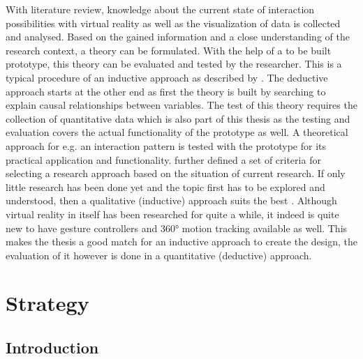 With literature review, knowledge about the current state of interaction possibilities with virtual reality as well as the visualization of data is collected and analysed. Based on the gained information and a close understanding of the research context, a theory can be formulated. With the help of a to be built prototype, this theory can be evaluated and tested by the researcher. This is a typical procedure of an inductive approach as described by \cite{Saunders2009}. \newline
The deductive approach starts at the other end as first the theory is built by searching to explain causal relationships between variables. The test of this theory requires the collection of quantitative data which is also part of this thesis as the testing and evaluation covers the actual functionality of the prototype as well. A theoretical approach for e.g. an interaction pattern is tested with the prototype for its practical application and functionality. \newline
\cite{Creswell2014} further defined a set of criteria for selecting a research approach based on the situation of current research. If only little research has been done yet and the topic first has to be explored and understood, then a qualitative (inductive) approach suits the best \citep{Creswell2014}. Although virtual reality in itself has been researched for quite a while, it indeed is quite new to have gesture controllers and 360° motion tracking available as well. This makes the thesis a good match for an inductive approach to create the design, the evaluation of it however is done in a quantitative (deductive) approach.




\section{Strategy}


\subsection{Introduction}


